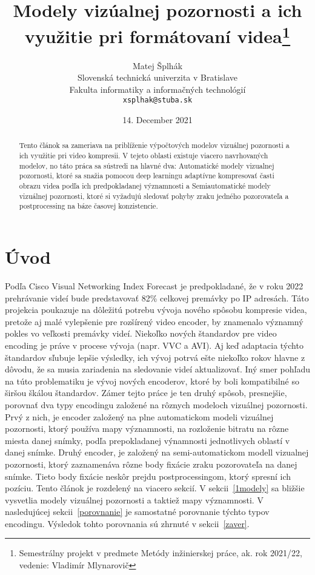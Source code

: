 \documentclass[10pt,twoside,slovak,a4paper]{article}
\title{Modely vizúalnej pozornosti a ich využitie pri formátovaní videa\thanks{Semestrálny projekt v predmete Metódy inžinierskej práce, ak. rok 2021/22, vedenie: Vladimír Mlynarovič}} %
\author{Matej Šplhák\\[2pt]
	{\small Slovenská technická univerzita v Bratislave}\\
	{\small Fakulta informatiky a informačných technológií}\\
	{\small \texttt{xsplhak@stuba.sk}}
	}
\date{\small 14. December 2021} %
\begin{document}
\maketitle
\begin{abstract}
Tento článok sa zameriava na priblíženie výpočtových modelov vizuálnej pozornosti a ich využitie pri video kompresii. V tejeto oblasti existuje viacero navrhovaných modelov, no táto práca sa sústredi na hlavné dva: Automatické modely vizualnej pozornosti, ktoré sa snažia pomocou deep learningu adaptívne kompresovať časti obrazu videa podľa ich predpokladanej významnosti a Semiautomatické modely vizuálnej pozornosti, ktoré  si vyžadujú sledovať pohyby zraku jedného pozorovateľa a postprocessing na báze časovej konzistencie. 
\end{abstract}


\section{Úvod}
Podľa Cisco  Visual  Networking  Index  Forecast\cite{cisco:forecast} je predpokladané, že v roku 2022 prehrávanie videí bude predstavovať 82\% celkovej premávky po IP adresách. Táto projekcia poukazuje na dôležitú potrebu vývoja nového spôsobu kompresie videa, pretože aj malé vylepšenie pre rozšírený video encoder, by znamenalo významný pokles vo veľkosti premávky videí. Niekoľko nových štandardov pre video encoding je práve v procese vývoja (napr. VVC a AVI). Aj keď adaptacia týchto štandardov sľubuje lepšie výsledky, ich vývoj potrvá ešte niekoľko rokov hlavne z dôvodu, že sa musia zariadenia na sledovanie videí aktualizovať. Iný smer pohľadu na túto problematiku je vývoj nových encoderov, ktoré by boli kompatibilné so širšou škálou štandardov. Zámer tejto práce je ten druhý spôsob, presnejšie, porovnať dva typy encodingu založené na rôznych modeloch vizuálnej pozornosti. Prvý z nich\cite{Czarnecki:Progress}, je encoder založený na plne automatickom modeli vizuálnej pozornosti, ktorý používa mapy významnosti, na rozloženie bitratu na rôzne miesta danej snímky, podľa prepokladanej výnamnosti jednotlivych oblastí v danej snímke. Druhý encoder\cite{Coplien:MPD}, je založený na semi-automatickom modell vizualnej pozornosti, ktorý zaznamenáva rôzne body fixácie zraku pozorovateľa na danej snímke. Tieto body fixácie neskôr prejdu postprocessingom, ktorý spresní ich pozíciu. Tento článok je rozdelený na viacero sekcií. V sekcii~\ref{1modely} sa bližšie vysvetlia modely vizuálnej pozornosti a taktiež mapy významnosti. V nasledujúcej sekcii~\ref{porovnanie} je samostatné porovnanie týchto typov encodingu. Výsledok tohto porovnania sú zhrnuté v sekcii~\ref{zaver}.   
\end{document}
